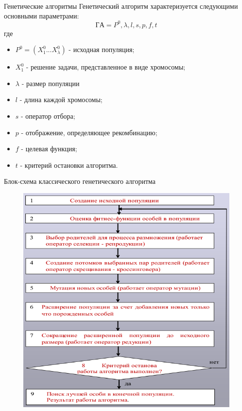 \documentclass{beamer}
\begin{document}
\begin{frame}{Генетические алгоритмы}
Генетический алгоритм характеризуется следующими основными параметрами:
\[ГА=P^0, \lambda, l, s, p, f, t\]
где
\begin{itemize}
\item $P^0 = (X^0_1...X^0_\lambda)$ - исходная популяция;
\item $X^0_1$ - решение задачи, представленное в виде хромосомы;
\item $\lambda$ - размер популяции
\item $l$ - длина каждой хромосомы;
\item $s$ - оператор отбора;
\item $p$ - отображение, определяющее рекомбинацию;
\item $f$ - целевая функция;
\item $t$ - критерий остановки алгоритма.
\end{itemize}
\end{frame}

\begin{frame}{Блок-схема классического генетического алгоритма}
\begin{figure}[h]
\centering
\includegraphics[scale=0.4]{images/lec04-pic04.png}
\end{figure}
\end{frame}
\end{document}
